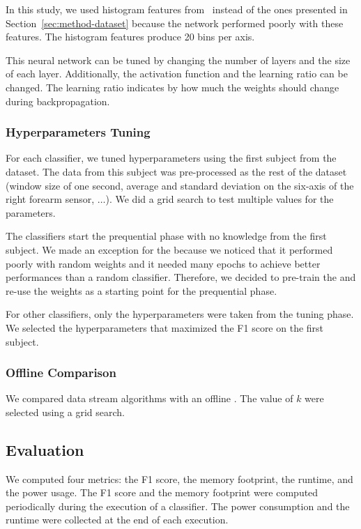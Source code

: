 In this study, we used histogram features from~\cite{omid_2019} instead of the
ones presented in Section~\ref{sec:method-dataset} because the network performed
poorly with these features. The histogram features produce 20 bins per axis.

This neural network can be tuned by changing the number of layers and the size
of each layer.  Additionally, the activation function and the learning ratio can
be changed. The learning ratio indicates by how much the weights should change
during backpropagation.

\subsubsection{Hyperparameters Tuning}
For each classifier, we tuned hyperparameters  using the first subject from the
\banosdataset dataset.  The data from this subject was pre-processed as the rest
of the \banosdataset dataset (window size of one second, average and standard
deviation on the six-axis of the right forearm sensor, $\ldots$). We did a grid
search to test multiple values for the parameters.

The classifiers start the prequential phase with no knowledge from the first
subject.  We made an exception for the \FNN because we noticed that it performed
poorly with random weights and it needed many epochs to achieve better
performances than a random  classifier. Therefore, we decided to pre-train the
\FNN and re-use the weights as a starting point for the prequential phase.

For other classifiers, only the hyperparameters were taken from the tuning
phase.  We selected the hyperparameters that maximized the F1 score on the first
subject.

\subsubsection{Offline Comparison}
We compared data stream algorithms with an offline \knn. The value of $k$ were
selected using a grid search.

\subsection{Evaluation}
We computed four metrics: the F1 score, the memory
footprint, the runtime, and the power usage.
The F1 score and the memory
footprint were computed periodically during the
execution of a classifier. The
power consumption and the runtime were collected
at the end of each execution.

